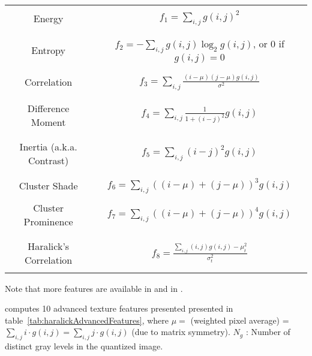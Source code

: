 \begin{table}
\begin{center}
\begin{tabular}{|c|c|}
\hline
& \\
Energy & $ f_1 = \sum_{i,j}g(i, j)^2 $ \\
& \\
\hline
& \\
Entropy & $ f_2 = -\sum_{i,j}g(i, j) \log_2 g(i, j)$, or 0 if $g(i, j) = 0$ \\
& \\
\hline
& \\
Correlation & $ f_3 = \sum_{i,j}\frac{(i - \mu)(j - \mu)g(i, j)}{\sigma^2} $ \\
& \\
\hline
& \\
Difference Moment &  $f_4 = \sum_{i,j}\frac{1}{1 + (i - j)^2}g(i, j) $ \\
& \\
\hline
& \\
Inertia (a.k.a. Contrast) & $ f_5 = \sum_{i,j}(i - j)^2g(i, j) $ \\
& \\
\hline
& \\
Cluster Shade & $ f_6 = \sum_{i,j}((i - \mu) + (j - \mu))^3 g(i, j) $ \\
& \\
\hline
Cluster Prominence & $ f_7 = \sum_{i,j}((i - \mu) + (j - \mu))^4 g(i, j) $ \\
& \\
\hline
& \\
Haralick's Correlation & $ f_8 = \frac{\sum_{i,j}(i, j) g(i, j) -\mu_t^2}{\sigma_t^2} $ \\
& \\
\hline
\end{tabular}
\end{center}
\label{tab:haralickStandardFeatures}
\end{table}

Note that more features are available in
 and in
.

 computes 10 advanced
texture features presented presented in table~\ref{tab:haralickAdvancedFeatures},
where $ \mu = $  (weighted pixel average) = $ \sum_{i, j}i \cdot g(i, j) =
\sum_{i,j}j \cdot g(i, j) $ (due to matrix symmetry).
$N_{g}$ : Number of distinct gray levels in the quantized image.

